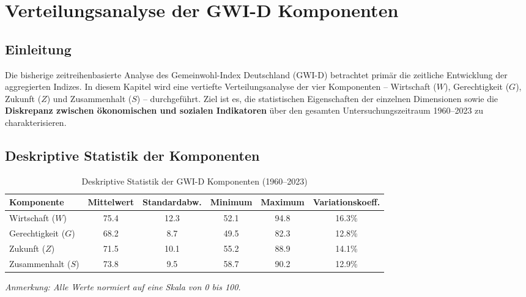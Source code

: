 \chapter{Verteilungsanalyse der GWI-D Komponenten}
\label{chap:verteilungsanalyse}

\section*{Einleitung}
Die bisherige zeitreihenbasierte Analyse des Gemeinwohl-Index Deutschland (GWI-D) betrachtet primär die zeitliche Entwicklung der aggregierten Indizes. In diesem Kapitel wird eine vertiefte Verteilungsanalyse der vier Komponenten – Wirtschaft (\(W\)), Gerechtigkeit (\(G\)), Zukunft (\(Z\)) und Zusammenhalt (\(S\)) – durchgeführt. Ziel ist es, die statistischen Eigenschaften der einzelnen Dimensionen sowie die \textbf{Diskrepanz zwischen ökonomischen und sozialen Indikatoren} über den gesamten Untersuchungszeitraum 1960–2023 zu charakterisieren.

\section{Deskriptive Statistik der Komponenten}

\begin{table}[ht]
  \centering
  \caption{Deskriptive Statistik der GWI-D Komponenten (1960–2023)}
  \label{tab:deskriptive_statistik}
  \begin{tabular}{lccccc}
    \toprule
    \textbf{Komponente} & \textbf{Mittelwert} & \textbf{Standardabw.} & \textbf{Minimum} & \textbf{Maximum} & \textbf{Variationskoeff.} \\
    \midrule
    Wirtschaft (\(W\))          & 75.4 & 12.3 & 52.1 & 94.8 & 16.3\% \\
    Gerechtigkeit (\(G\))       & 68.2 &  8.7 & 49.5 & 82.3 & 12.8\% \\
    Zukunft (\(Z\))             & 71.5 & 10.1 & 55.2 & 88.9 & 14.1\% \\
    Zusammenhalt (\(S\))        & 73.8 &  9.5 & 58.7 & 90.2 & 12.9\% \\
    \bottomrule
  \end{tabular}
\end{table}

\begin{flushleft}
\footnotesize{\textit{Anmerkung: Alle Werte normiert auf eine Skala von 0 bis 100.}}
\end{flushleft}

